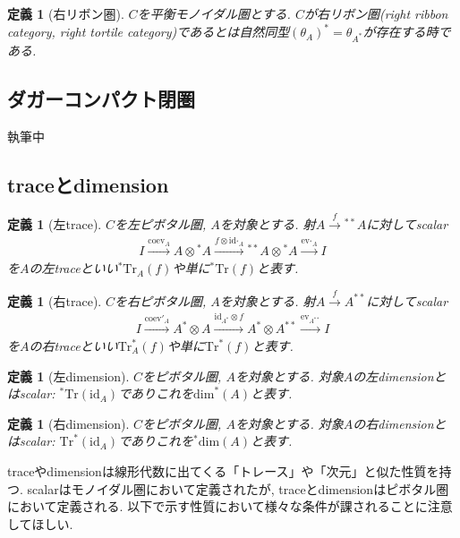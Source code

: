 \documentclass[a4paper,12pt]{ltjsarticle}
\theoremstyle{break}
\newtheorem{defn}[thm]{定義}
\newcommand{\xr}[1]{\xrightarrow{#1}}
\newcommand{\id}{\mathrm{id}}
\newcommand{\eva}{\mathrm{ev}}
\newcommand{\coev}{\mathrm{coev}}
\newcommand{\ot}{\otimes}
\newcommand{\tra}{\mathrm{Tr}}
\newcommand{\dime}{\mathrm{dim}}
\numberwithin{equation}{section}
\begin{document}
\begin{defn}[右リボン圏]
  $C$を平衡モノイダル圏とする. $C$が右リボン圏(right ribbon category, right tortile category)であるとは自然同型$(\theta_A)^*=\theta_{A^*}$が存在する時である. 
\end{defn}

\subsection{ダガーコンパクト閉圏}
執筆中

\subsection{traceとdimension}

\begin{defn}[左trace]
  $C$を左ピボタル圏, $A$を対象とする. 
  射$A \xr{f} {}^{**}A$に対してscalar
  \begin{align*}
    I \xr{\coev_A} A \ot {}^*A \xr{f \ot \id_{{}^*A}} {}^{**}A \ot {}^*A \xr{\eva_{{}^*A}} I
  \end{align*}  
    を$A$の左traceといい${}^*\tra_A(f)$や単に${}^*\tra(f)$と表す.  
\end{defn}

\begin{defn}[右trace]
  $C$を右ピボタル圏, $A$を対象とする. 
  射$A \xr{f} A^{**}$に対してscalar
  \begin{align*}
    I \xr{\coev'_A} A^* \ot A \xr{\id_{A^*} \ot f} A^* \ot A^{**} \xr{\eva_{A^{**}}} I
  \end{align*}  
    を$A$の右traceといい$\tra^*_A(f)$や単に$\tra^*(f)$と表す.  
\end{defn}

\begin{defn}[左dimension]%
  $C$をピボタル圏, $A$を対象とする. 
  対象$A$の左dimensionとはscalar: ${}^*\tra(\id_A)$でありこれを$\dime^*(A)$と表す. 
\end{defn}

\begin{defn}[右dimension]%
  $C$をピボタル圏, $A$を対象とする. 
  対象$A$の右dimensionとはscalar: $\tra^*(\id_A)$でありこれを${}^*\dime(A)$と表す. 
\end{defn}

traceやdimensionは線形代数に出てくる「トレース」や「次元」と似た性質を持つ. 
scalarはモノイダル圏において定義されたが, traceとdimensionはピボタル圏において定義される. 
以下で示す性質において様々な条件が課されることに注意してほしい. 
\end{document}
